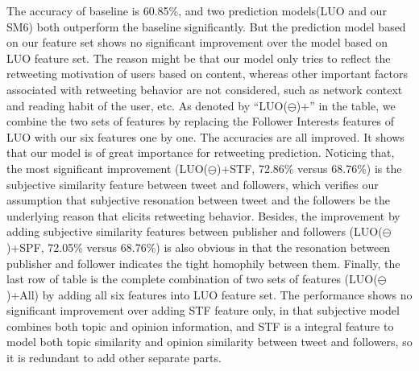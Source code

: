 \documentclass{acm_proc_article-sp}
\begin{document}
The accuracy of baseline is 60.85\%, and two prediction models(LUO and our SM6) both outperform the baseline significantly. 
But the prediction model based on our feature set shows no significant improvement over the model based on LUO feature set. 
The reason might be that our model only tries to reflect the retweeting motivation of users based on content, whereas other important factors associated with retweeting behavior are not considered, such as network context and reading habit of the user, etc. 
As denoted by ``LUO($ \ominus $)+'' in the table, we combine the two sets of features by replacing the Follower Interests features of LUO with our six features one by one. 
The accuracies are all improved. It shows that our model is of great importance for retweeting prediction. 
Noticing that, the most significant improvement (LUO($ \ominus $)+STF, 72.86\% versus 68.76\%) is the subjective similarity feature between tweet and followers, which verifies our assumption that subjective resonation between tweet and the followers be the underlying reason that elicits retweeting behavior.
Besides, the improvement by adding subjective similarity features between publisher and followers (LUO($ \ominus $)+SPF, 72.05\% versus 68.76\%) is also obvious in that the resonation between publisher and follower indicates the tight homophily between them.
Finally, the last row of table is the complete combination of two sets of features (LUO($ \ominus $)+All) by adding all six features into LUO feature set. 
The performance shows no significant improvement over adding STF feature only, in that subjective model combines both topic and opinion information, and STF is a integral feature to model both topic similarity and opinion similarity between tweet and followers, so it is redundant to add other separate parts.
\end{document}

